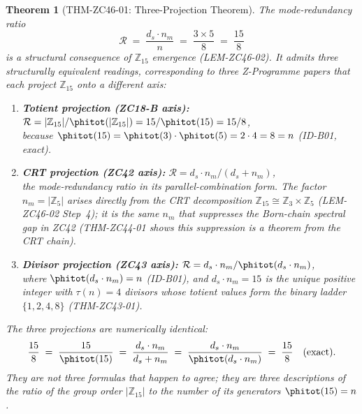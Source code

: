 \documentclass[12pt, a4paper]{article}
\newtheorem{theorem}{Theorem}[section]
\begin{document}
\begin{formalbox}[title={THM-ZC46-01: $\mathbb{Z}_{15}$
  Three-Projection Theorem (Conditional Theorem)}]

\begin{theorem}[THM-ZC46-01: Three-Projection Theorem]
\label{thm:zc46-01}
The mode-redundancy ratio
\begin{equation}
  \mathcal{R} \;=\; \frac{d_s \cdot n_m}{n}
  \;=\; \frac{3 \times 5}{8}
  \;=\; \frac{15}{8}
  \tag{THM-ZC46-01}\label{eq:R}
\end{equation}
is a structural consequence of $\mathbb{Z}_{15}$ emergence
(LEM-ZC46-02).
It admits three structurally equivalent readings, corresponding
to three Z-Programme papers that each project $\mathbb{Z}_{15}$
onto a different axis:

\begin{enumerate}[leftmargin=*, itemsep=4pt]
\item \textbf{Totient projection (ZC18-B axis):}
$\mathcal{R} = |\mathbb{Z}_{15}|/\phitot(|\mathbb{Z}_{15}|)
= 15/\phitot(15) = 15/8$,\\
because $\phitot(15) = \phitot(3)\cdot\phitot(5) = 2\cdot 4 = 8 = n$
(ID-B01, exact).

\item \textbf{CRT projection (ZC42 axis):}
$\mathcal{R} = d_s\cdot n_m/(d_s + n_m)$,\\
the mode-redundancy ratio in its parallel-combination form.
The factor $n_m = |\mathbb{Z}_5|$ arises directly from the
CRT decomposition $\mathbb{Z}_{15} \cong \mathbb{Z}_3 \times
\mathbb{Z}_5$ (LEM-ZC46-02 Step~4);
it is the same $n_m$ that suppresses the Born-chain spectral gap
in ZC42 (THM-ZC44-01 shows this suppression is a theorem from
the CRT chain).

\item \textbf{Divisor projection (ZC43 axis):}
$\mathcal{R} = d_s\cdot n_m/\phitot(d_s\cdot n_m)$,\\
where $\phitot(d_s\cdot n_m) = n$ (ID-B01), and $d_s\cdot n_m
= 15$ is the unique positive integer with $\tau(n)=4$ divisors
whose totient values form the binary ladder $\{1,2,4,8\}$
(THM-ZC43-01).
\end{enumerate}

The three projections are numerically identical:
\[
  \frac{15}{8}
  \;=\; \frac{15}{\phitot(15)}
  \;=\; \frac{d_s\cdot n_m}{d_s + n_m}
  \;=\; \frac{d_s\cdot n_m}{\phitot(d_s\cdot n_m)}
  \;=\; \frac{15}{8} \quad\text{(exact)}.
\]
They are not three formulas that happen to agree; they are three
descriptions of the ratio of the group order $|\mathbb{Z}_{15}|$
to the number of its generators $\phitot(15) = n$.


\end{theorem}
\end{formalbox}
\end{document}
